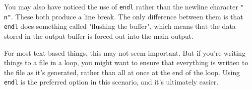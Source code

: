 You may also have noticed the use of \texttt{endl} rather than the newline character \texttt{"\\n"}.  These both produce a line break.  The only difference between them is that \texttt{endl} does something called "flushing the buffer", which means that the data stored in the output buffer is forced out into the main output.

For most text-based things, this may not seem important.  But if you're writing things to a file in a loop, you might want to ensure that everything is written to the file as it's generated, rather than all at once at the end of the loop.  Using \texttt{endl} is the preferred option in this scenario, and it's ultimately easier.
